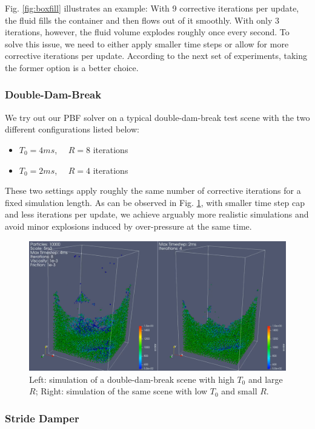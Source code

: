 \documentclass[
	11pt, 
	DIV10,
	ngerman,
	a4paper, 
	oneside, 
	headings=normal, 
	captions=tableheading,
	final, 
	numbers=noenddot
]{scrartcl}
\begin{document}
Fig. \ref{fig:boxfill} illustrates an example: With 9 corrective iterations per update, the fluid fills the container and then flows out of it smoothly. With only 3 iterations, however, the fluid volume explodes roughly once every second. To solve this issue, we need to either apply smaller time steps or allow for more corrective iterations per update. According to the next set of experiments, taking the former option is a better choice.

\subsubsection{Double-Dam-Break}

We try out our PBF solver on a typical double-dam-break test scene with the two different configurations listed below:

\begin{itemize}
    \item $ T_{0} = 4ms $, $ \quad R = 8 $ iterations
    \item $ T_{0} = 2ms $, $ \quad R = 4 $ iterations
\end{itemize}

These two settings apply roughly the same number of corrective iterations for a fixed simulation length. As can be observed in Fig. \ref{fig:doubleDam}, with smaller time step cap and less iterations per update, we achieve arguably more realistic simulations and avoid minor explosions induced by over-pressure at the same time.

\begin{figure}[h]
    \centering
    \includegraphics[width=.6\textwidth]{pics/pbf_iter_ts.png}
    \caption{Left: simulation of a double-dam-break scene with high $ T_{0} $ and large $ R $; Right: simulation of the same scene with low $ T_{0} $ and small $ R $.}
    \label{fig:doubleDam}
\end{figure}

\subsubsection{Stride Damper}
\end{document}
